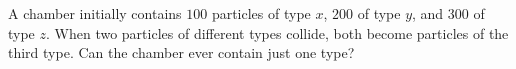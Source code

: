 A chamber initially contains $100$ particles of type $x$, $200$ of type $y$, and $300$ of type $z$. When two particles of different types collide, both become particles of the third type. Can the chamber ever contain just one type?
